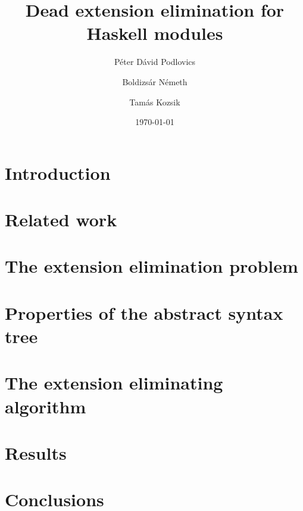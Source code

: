 \documentclass[11pt]{amsart}
\title{Dead extension elimination for Haskell modules}
\date{\today}
\author{Péter Dávid Podlovics}
\author{Boldizsár Németh}
\author{Tamás Kozsik}
\begin{document}
	
	
	\maketitle

	\section{Introduction}
	
	
	\section{Related work}
	
	
	\section{The extension elimination problem} \label{ext-elim_problem}
	
	
	\section{Properties of the abstract syntax tree}
	
	
	\section{The extension eliminating algorithm} \label{algorithm}
	
	
	\section{Results}
	
	
	\section{Conclusions}
	
	
	\newpage
	
	
\end{document}
